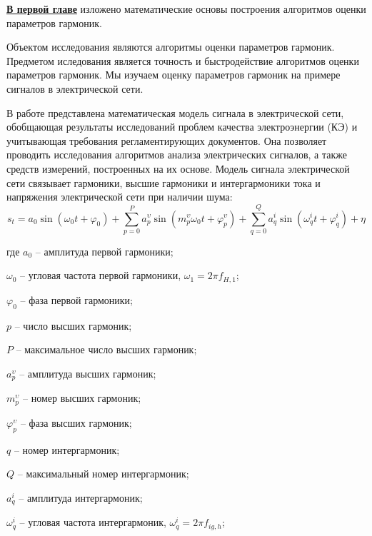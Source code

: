 \underline{\textbf{В первой главе}} изложено %
математические основы построения алгоритмов оценки параметров гармоник.

Объектом исследования являются алгоритмы оценки параметров гармоник. Предметом иследования является точность и быстродействие алгоритмов оценки параметров гармоник. Мы изучаем оценку параметров гармоник на примере сигналов в электрической сети.

В работе представлена математическая модель сигнала в электрической сети, обобщающая результаты исследований проблем качества электроэнергии (КЭ) и учитывающая требования регламентирующих документов. Она позволяет проводить исследования алгоритмов анализа электрических сигналов, а также средств измерений, построенных на их основе.
Модель сигнала электрической сети связывает гармоники, высшие гармоники и интергармоники тока и напряжения электрической сети при наличии шума: 
\begin{equation}
	\label{eq:equation1}
	s_{t} = a_{0} \sin (\omega_{0} t + \varphi_{0}) + \displaystyle\sum_{p=0}^{P} a_p^{\upsilon} \sin (m_p^{\upsilon} \omega_{0} t + \varphi_p^{\upsilon}) + \displaystyle\sum_{q=0}^{Q} a_q^i \sin  (\omega_q^i t + \varphi_q^{i})+\eta
\end{equation}

где $a_{0}$ – амплитуда первой гармоники;

$\omega_{0}$ – угловая частота первой гармоники, $\omega_{1} = 2 \pi f_{H,1}$;

$\varphi_{0}$ – фаза первой гармоники; 

$p$ – число высших гармоник;

$P$ – максимальное число высших гармоник;

$a_p^{\upsilon}$ – амплитуда высших гармоник;

$m_p^{\upsilon}$ – номер высших гармоник;

$\varphi_p^{\upsilon}$ – фаза высших гармоник;

$q$ – номер интергармоник;

$Q$ – максимальный номер интергармоник;

$a_q^i$ – амплитуда интергармоник;

$\omega_q^i$ – угловая частота интергармоник, $\omega_q^i=2\pi f_{ig,h}$; 

